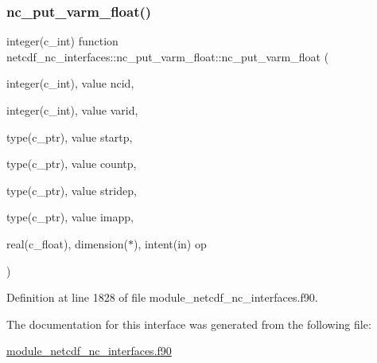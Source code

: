\subsubsection{\texorpdfstring{nc\+\_\+put\+\_\+varm\+\_\+float()}{nc\_put\_varm\_float()}}
{\footnotesize\ttfamily integer(c\+\_\+int) function netcdf\+\_\+nc\+\_\+interfaces\+::nc\+\_\+put\+\_\+varm\+\_\+float\+::nc\+\_\+put\+\_\+varm\+\_\+float (\begin{DoxyParamCaption}\item[{integer(c\+\_\+int), value}]{ncid,  }\item[{integer(c\+\_\+int), value}]{varid,  }\item[{type(c\+\_\+ptr), value}]{startp,  }\item[{type(c\+\_\+ptr), value}]{countp,  }\item[{type(c\+\_\+ptr), value}]{stridep,  }\item[{type(c\+\_\+ptr), value}]{imapp,  }\item[{real(c\+\_\+float), dimension($\ast$), intent(in)}]{op }\end{DoxyParamCaption})}



Definition at line 1828 of file module\+\_\+netcdf\+\_\+nc\+\_\+interfaces.\+f90.



The documentation for this interface was generated from the following file\+:\begin{DoxyCompactItemize}
\item 
\hyperlink{module__netcdf__nc__interfaces_8f90}{module\+\_\+netcdf\+\_\+nc\+\_\+interfaces.\+f90}\end{DoxyCompactItemize}
